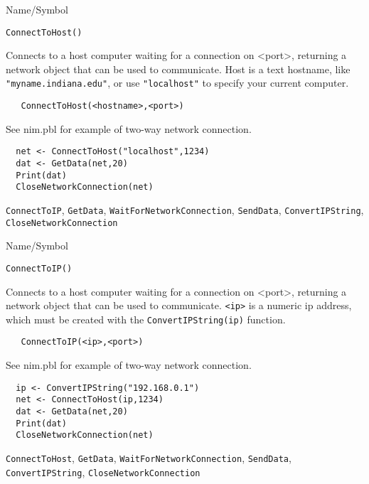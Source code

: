 \begin{desc}{Name/Symbol}
\item[Name/Symbol]	\verb+ConnectToHost()+

\item[Description]	Connects to a host computer waiting for a
  connection on <port>, returning a network object that can be used to
  communicate.  Host is a text hostname, like \verb+"myname.indiana.edu"+, or
  use \verb+"localhost"+ to specify your current computer.

\item[Usage]
\begin{verbatim}
   ConnectToHost(<hostname>,<port>)
\end{verbatim}

\item[Example]	

  See nim.pbl for example of two-way network connection.
\begin{verbatim}
  net <- ConnectToHost("localhost",1234)
  dat <- GetData(net,20)
  Print(dat)
  CloseNetworkConnection(net)
\end{verbatim}

\item[See Also]
  \verb+ConnectToIP+, \verb+GetData+, \verb+WaitForNetworkConnection+,
   \verb+SendData+, \verb+ConvertIPString+, \verb+CloseNetworkConnection+
\end{desc}

\rl

\begin{desc}{Name/Symbol}
\item[Name/Symbol]	\verb+ConnectToIP()+

\item[Description]	Connects to a host computer waiting for a
  connection on <port>, returning a network object that can be used to
  communicate.  \verb+<ip>+ is a numeric ip address, which must be
  created with the \verb+ConvertIPString(ip)+ function. 

\item[Usage]
\begin{verbatim}
   ConnectToIP(<ip>,<port>)
\end{verbatim}

\item[Example]	

  See nim.pbl for example of two-way network connection.
\begin{verbatim}
  ip <- ConvertIPString("192.168.0.1")
  net <- ConnectToHost(ip,1234)
  dat <- GetData(net,20)
  Print(dat)
  CloseNetworkConnection(net)
\end{verbatim}

\item[See Also]
  \verb+ConnectToHost+, \verb+GetData+, \verb+WaitForNetworkConnection+,
   \verb+SendData+, \verb+ConvertIPString+, \verb+CloseNetworkConnection+
\end{desc}

